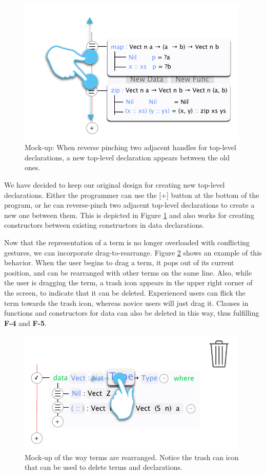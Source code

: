 \begin{figure}
	\centering
		\includegraphics[width=110mm]{diagrams/new_function_reverse_pinch.pdf}
	\caption{Mock-up: When reverse pinching two adjacent handles for top-level
	declarations, a new top-level declaration appears between the old ones.}
\label{fig:new_function_reverse_pinch}
\end{figure}

We have decided to keep our original design for creating new top-level
declarations. Either the programmer can use the [+] button at the bottom of
the program, or he can reverse-pinch two adjacent top-level declarations to
create a new one between them. This is depicted in Figure \ref{fig:new_function_reverse_pinch} and also works for creating constructors
between existing constructors in data declarations.

Now that the representation of a term is no longer overloaded with conflicting
gestures, we can incorporate drag-to-rearrange. Figure \ref{fig:design_drag_to_garbage}
shows an example of this behavior. When the user begins to drag a term, it pops
out of its current position, and can be rearranged with other terms on the same
line. Also, while the user is dragging the term, a trash icon appears in the
upper right corner of the screen, to indicate that it can be deleted. Experienced users can flick the term towards the trash icon, whereas novice users will just drag it.
Clauses in functions and constructors for data can also be deleted in this way, thus fulfilling \textbf{F-4} and \textbf{F-5}.

\begin{figure}
	\centering
		\includegraphics[width=110mm]{diagrams/design_drag_to_garbage.pdf}
	\caption{Mock-up of the way terms are rearranged. Notice the trash can icon
	that can be used to delete terms and declarations.}
\label{fig:design_drag_to_garbage}
\end{figure}

